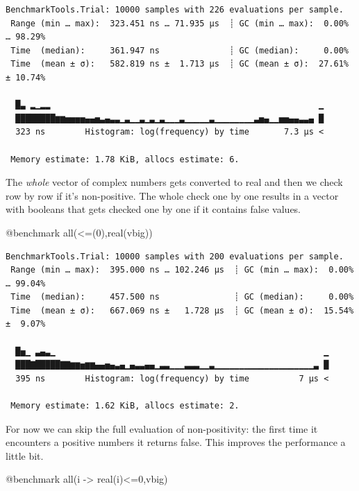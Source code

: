 \documentclass[
  a4paper,
  DIV=11,
  numbers=noendperiod]{scrreprt}
\newenvironment{Shaded}{\begin{snugshade}}{\end{snugshade}}
\newcommand{\FloatTok}[1]{\textcolor[rgb]{0.68,0.00,0.00}{#1}}
\newcommand{\FunctionTok}[1]{\textcolor[rgb]{0.28,0.35,0.67}{#1}}
\newcommand{\NormalTok}[1]{\textcolor[rgb]{0.00,0.23,0.31}{#1}}
\newcommand{\OperatorTok}[1]{\textcolor[rgb]{0.37,0.37,0.37}{#1}}
\newcommand{\PreprocessorTok}[1]{\textcolor[rgb]{0.68,0.00,0.00}{#1}}
\begin{document}
\begin{verbatim}
BenchmarkTools.Trial: 10000 samples with 226 evaluations per sample.
 Range (min … max):  323.451 ns … 71.935 μs  ┊ GC (min … max):  0.00% … 98.29%
 Time  (median):     361.947 ns              ┊ GC (median):     0.00%
 Time  (mean ± σ):   582.819 ns ±  1.713 μs  ┊ GC (mean ± σ):  27.61% ± 10.74%

  █▃ ▂▁▂▂                                                      ▁
  ████████▆▆▅▅▅▅▄▄▅▃▄▃▃▁▃▁▁▃▁▃▁▃▁▁▁▃▁▁▁▁▁▃▁▁▁▁▁▁▁▁▃▅▄▁▁▅▅▄▄▃▃▄ █
  323 ns        Histogram: log(frequency) by time       7.3 μs <

 Memory estimate: 1.78 KiB, allocs estimate: 6.
\end{verbatim}

The \emph{whole} vector of complex numbers gets converted to real and
then we check row by row if it's non-positive. The whole check one by
one results in a vector with booleans that gets checked one by one if it
contains false values.

\begin{Shaded}
\begin{Highlighting}[]
\PreprocessorTok{@benchmark} \FunctionTok{all}\NormalTok{(}\OperatorTok{\textless{}=}\NormalTok{(}\FloatTok{0}\NormalTok{),}\FunctionTok{real}\NormalTok{(vbig))}
\end{Highlighting}
\end{Shaded}

\begin{verbatim}
BenchmarkTools.Trial: 10000 samples with 200 evaluations per sample.
 Range (min … max):  395.000 ns … 102.246 μs  ┊ GC (min … max):  0.00% … 99.04%
 Time  (median):     457.500 ns               ┊ GC (median):     0.00%
 Time  (mean ± σ):   667.069 ns ±   1.728 μs  ┊ GC (mean ± σ):  15.54% ±  9.07%

  █▅▁ ▃▄▃▁                                                      ▁
  ███▇█████▇▇▆▆▅▆▆▄▄▅▄▃▄▁▄▃▃▄▄▁▃▃▁▁▁▃▃▃▁▁▃▁▁▁▁▁▁▁▁▁▁▁▁▁▁▁▁▁▁▁▁▃ █
  395 ns        Histogram: log(frequency) by time          7 μs <

 Memory estimate: 1.62 KiB, allocs estimate: 2.
\end{verbatim}

For now we can skip the full evaluation of non-positivity: the first
time it encounters a positive numbers it returns false. This improves
the performance a little bit.

\begin{Shaded}
\begin{Highlighting}[]
\PreprocessorTok{@benchmark} \FunctionTok{all}\NormalTok{(i }\OperatorTok{{-}\textgreater{}} \FunctionTok{real}\NormalTok{(i)}\OperatorTok{\textless{}=}\FloatTok{0}\NormalTok{,vbig)}
\end{Highlighting}
\end{Shaded}
\end{document}

